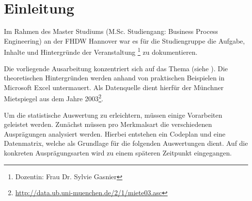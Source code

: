 \section{Einleitung}

Im Rahmen des Master Studiums (M.Sc. Studiengang: Business Process Engineering) an der FHDW Hannover
war es für die Studiengruppe  die Aufgabe, Inhalte und Hintergründe der Veranstaltung \footnote{Dozentin: Frau Dr. Sylvie Gasnier} zu dokumentieren.


Die vorliegende Ausarbeitung konzentriert sich auf das Thema  (siehe ). Die theoretischen Hintergründen werden anhand von praktischen Beispielen in Microsoft Excel untermauert. 
Als Datenquelle dient hierfür der Münchner Mietspiegel aus dem Jahre 2003\footnote{\url{http://data.ub.uni-muenchen.de/2/1/miete03.asc}}.

Um die statistische Auswertung zu erleichtern, müssen einige Vorarbeiten geleistet werden. Zunächst müssen pro Merkmalsart die verschiedenen Ausprägungen 
analysiert werden. Hierbei entstehen ein Codeplan und eine Datenmatrix, welche als Grundlage für die folgenden Auswertungen dient. 
Auf die konkreten Ausprägungsarten wird zu einem späteren Zeitpunkt eingegangen.